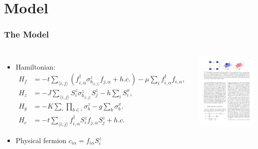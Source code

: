 \documentclass[xcolor=table, 10pt, aspectratio=1610]{beamer}
\begin{document}
\section{Model}

\begin{frame}
  \frametitle{The Model}
  \begin{columns}
\begin{itemize}
\item Hamiltonian:
	\begin{align*}
	H_f &= -t\sum_{\langle i,j \rangle} (f^{\dagger}_{i,\alpha} \sigma^{z}_{b_{\langle i,j \rangle}}f_{j,\alpha} + h.c.) -\mu\sum_{i}f^{\dagger}_{i,\alpha}f_{i,\alpha}, \nonumber\\
	H_{z} &= -J \sum_{\langle i,j \rangle} S^{z}_{i} \sigma^{z}_{b_{\langle i,j \rangle}} S^{z}_{j} - h \sum_{i} S^{x}_{i}, \nonumber\\
	H_{g} &= -K \sum_{\square}\prod_{b\in\square} \sigma^{z}_{b} - g\sum_{b} \sigma^{x}_{b}.\\
	H_{c} &= -t \sum_{\langle i,j\rangle} f^{\dagger}_{i,\alpha}S^{z}_{i}f_{j,\alpha}S^{z}_{j} + h.c.
\end{align*}
\item Physical fermion $c_{i\alpha} = f_{i\alpha}S_i^z$
\end{itemize}
\begin{center}
	\includegraphics[width=4cm]{model_l}
      \end{center}
      \end{columns}
\end{frame}
\end{document}
